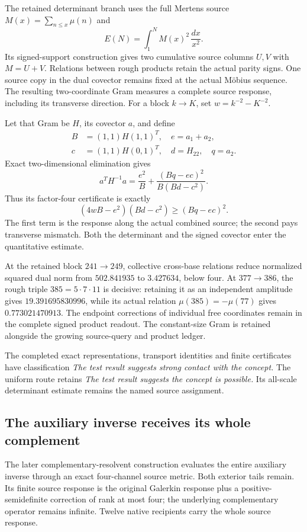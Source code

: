 The retained determinant branch uses the full Mertens source
\(M(x)=\sum_{n\leq x}\mu(n)\) and
\[
 E(N)=\int_1^NM(x)^2\,\frac{dx}{x^2}.
\]
Its signed-support construction gives two cumulative source columns
\(U,V\) with \(M=U+V\). Relations between rough products retain the
actual parity signs. One source copy in the dual covector remains fixed
at the actual Möbius sequence. The resulting two-coordinate Gram
measures a complete source response, including its transverse
direction. For a block \(k\to K\), set \(w=k^{-2}-K^{-2}\).

Let that Gram be \(H\), its covector \(a\), and define
\[
\begin{aligned}
 B&=(1,1)H(1,1)^T,\quad e=a_1+a_2,\\
 c&=(1,1)H(0,1)^T,\quad d=H_{22},\quad q=a_2.
\end{aligned}
\]
Exact two-dimensional elimination gives
\[
 a^TH^{-1}a=\frac{e^2}{B}
       +\frac{(Bq-ec)^2}{B(Bd-c^2)}.
\]
Thus its factor-four certificate is exactly
\[
 (4wB-e^2)(Bd-c^2)\geq(Bq-ec)^2.
\]
The first term is the response along the actual combined source;
the second pays transverse mismatch. Both the determinant and the
signed covector enter the quantitative estimate.

At the retained block \(241\to249\), collective cross-base relations
reduce normalized squared dual norm from \(502.841935\) to
\(3.427634\), below four. At \(377\to386\), the rough triple
\(385=5\cdot7\cdot11\) is decisive: retaining it as an independent
amplitude gives \(19.391695830996\), while its actual relation
\(\mu(385)=-\mu(77)\) gives \(0.773021470913\). The endpoint
corrections of individual free coordinates remain in the complete
signed product readout. The constant-size Gram is retained alongside
the growing source-query and product ledger.

The completed exact representations, transport identities and finite
certificates have classification \emph{The test result suggests strong
contact with the concept.} The uniform route retains
\emph{The test result suggests the concept is possible.}
Its all-scale determinant estimate remains the named source
assignment.

\subsection{The auxiliary inverse receives its whole complement}

The later complementary-resolvent construction evaluates the entire
auxiliary inverse through an exact four-channel source metric. Both
exterior tails remain. Its finite source response is the original
Galerkin response plus a positive-semidefinite correction of rank at
most four; the underlying complementary operator remains infinite.
Twelve native recipients carry the whole source response.

